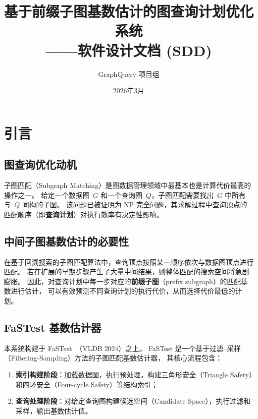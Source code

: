 \documentclass[12pt,a4paper]{article}
\title{基于前缀子图基数估计的图查询计划优化系统\\——软件设计文档 (SDD)}
\author{GraphQuery 项目组}
\date{2026年3月}
\begin{document}
\maketitle
\tableofcontents
\newpage

\section{引言}
\label{sec:intro}

\subsection{图查询优化动机}

子图匹配（Subgraph Matching）是图数据管理领域中最基本也是计算代价最高的操作之一。
给定一个数据图~$G$ 和一个查询图~$Q$，子图匹配需要找出~$G$ 中所有与~$Q$ 同构的子图。
该问题已被证明为 NP 完全问题，其求解过程中查询顶点的匹配顺序（即\textbf{查询计划}）对执行效率有决定性影响。

\subsection{中间子图基数估计的必要性}

在基于回溯搜索的子图匹配算法中，查询顶点按照某一顺序依次与数据图顶点进行匹配。
若在扩展的早期步骤产生了大量中间结果，则整体匹配的搜索空间将急剧膨胀。
因此，对查询计划中每一步对应的\textbf{前缀子图}（prefix subgraph）的匹配基数进行估计，
可以有效预测不同查询计划的执行代价，从而选择代价最低的计划。

\subsection{FaSTest 基数估计器}

本系统构建于 FaSTest~\cite{fastest2024}（VLDB 2024）之上。
FaSTest 是一个基于过滤--采样（Filtering-Sampling）方法的子图匹配基数估计器，
其核心流程包含：
\begin{enumerate}[label=(\arabic*)]
  \item \textbf{索引构建阶段}：加载数据图，执行预处理，构建三角形安全（Triangle Safety）和四环安全（Four-cycle Safety）等结构索引；
  \item \textbf{查询处理阶段}：对给定查询图构建候选空间（Candidate Space），执行过滤和采样，输出基数估计值。
\end{enumerate}
\end{document}
